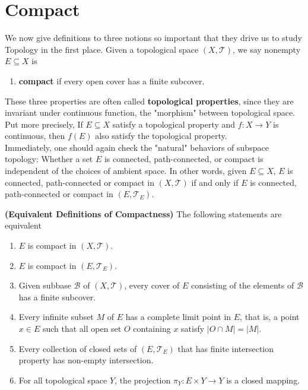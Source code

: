 \documentclass{report}
\begin{document}
\section{Compact}
\begin{abstract}

\end{abstract}
\begin{mdframed}
We now give definitions to three notions so important that they drive us to study Topology in the first place. Given a topological space $(X, \mathscr{T})$, we say nonempty $E \subseteq X$ is
\begin{enumerate}[label=(\alph*)]
    \item \textbf{compact} if every open cover has a finite subcover.
\end{enumerate}
\label{topological properties}
These three properties are often called \textbf{topological properties}, since they are invariant under continuous function, the "morphism" between topological space. Put more precisely, If $E \subseteq X$ satisfy a topological property and $f : X \to Y$ is continuous, then $f(E)$ also satisfy the topological property.\\

Immediately, one should again check the "natural" behaviors of subspace topology: Whether a set $E$ is connected, path-connected, or compact is independent of the choices of ambient space. In other words, given $E \subseteq X$, $E$ is connected, path-connected or compact in $(X, \mathscr{T})$ if and only if $E$ is connected, path-connected or compact in $(E, \mathscr{T}_E)$.
\end{mdframed}
\begin{theorem}
\label{Equivalent Definitions of Compactness}
\textbf{(Equivalent Definitions of Compactness)} The following statements are equivalent
\begin{enumerate}[label=(\alph*)]
    \item $E$ is compact in $(X, \mathscr{T})$. 
    \item $E$ is compact in $(E, \mathscr{T}_E)$. 
    \item Given subbase $\mathcal{B}$ of $(X, \mathscr{T})$, every cover of $E$ consisting of the elements of $\mathcal{B}$ has a finite subcover. 
    \item Every infinite subset $M$ of $E$ has a complete limit point in $E$, that is, a point $x \in E$ such that all open set $O$ containing $x$ satisfy $|O \cap M| = |M|$. 
    \item Every collection of closed sets of $(E, \mathscr{T}_E)$ that has finite intersection property has non-empty intersection. 
    \item For all topological space $Y$, the projection $\pi_Y : E \times Y \to Y$ is a closed mapping.
\end{enumerate}
\end{theorem}
\end{document}
